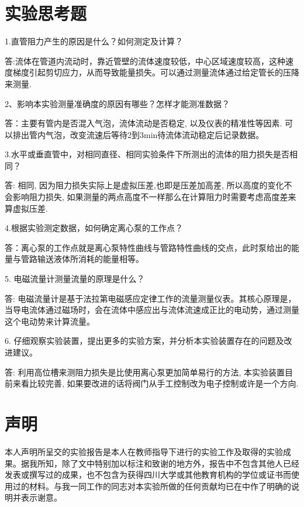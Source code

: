 \documentclass[a4paper,UTF8]{ctexrep}
\theoremstyle{plain}
\theoremstyle{definition}
\numberwithin{equation}{chapter}
\begin{document}
        \section{实验思考题}
	1.直管阻力产生的原因是什么？如何测定及计算？

    答:流体在管道内流动时，靠近管壁的流体速度较低，中心区域速度较高，这种速度梯度引起剪切应力，从而导致能量损失。可以通过测量流体通过给定管长的压降来测量.

    2、影响本实验测量准确度的原因有哪些？怎样才能测准数据？
    
    答：主要有管内是否混入气泡，流体流动是否稳定, 以及仪表的精准性等因素. 可以排出管内气泡，改变流速后等待2到3min待流体流动稳定后记录数据。

    3.水平或垂直管中，对相同直径、相同实验条件下所测出的流体的阻力损失是否相同？

    答: 相同, 因为阻力损失实际上是虚拟压差,也即是压差加高差, 所以高度的变化不会影响阻力损失, 如果测量的两点高度不一样那么在计算阻力时需要考虑高度差来算虚拟压差.

    4.根据实验测定数据，如何确定离心泵的工作点？
    
    答：离心泵的工作点就是离心泵特性曲线与管路特性曲线的交点，此时泵给出的能量与管路输送液体所消耗的能量相等。

    5. 电磁流量计测量流量的原理是什么？

    答: 电磁流量计是基于法拉第电磁感应定律工作的流量测量仪表。其核心原理是，当导电流体通过磁场时，会在流体中感应出与流体流速成正比的电动势，通过测量这个电动势来计算流量。

    6. 仔细观察实验装置，提出更多的实验方案，并分析本实验装置存在的问题及改进建议。

    答: 利用高位槽来测阻力损失是比使用离心泵更加简单易行的方法, 本实验装置目前来看比较完善, 如果要改进的话将阀门从手工控制改为电子控制或许是一个方向. 
	
	
	
	
	\section*{声\hspace{0.8cm}明}


	本人声明所呈交的实验报告是本人在教师指导下进行的实验工作及取得的实验成果。据我所知，除了文中特别加以标注和致谢的地方外，报告中不包含其他人已经发表或撰写过的成果，也不包含为获得四川大学或其他教育机构的学位或证书而使用过的材料。与我一同工作的同志对本实验所做的任何贡献均已在中作了明确的说明并表示谢意。
	
\end{document}
